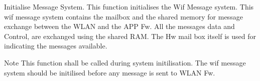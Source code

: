 Initialise Message System. This function initialises the Wif Message system. This wif message system contains the mailbox and the shared memory for message exchange between the WLAN and the APP Fw. All the messages data and Control, are exchanged using the shared RAM. The Hw mail box itself is used for indicating the messages available. 

\begin{DoxyNote}{Note}
This function shall be called during system initilisation. The wif message system should be initilised before any message is sent to WLAN Fw. 
\end{DoxyNote}
